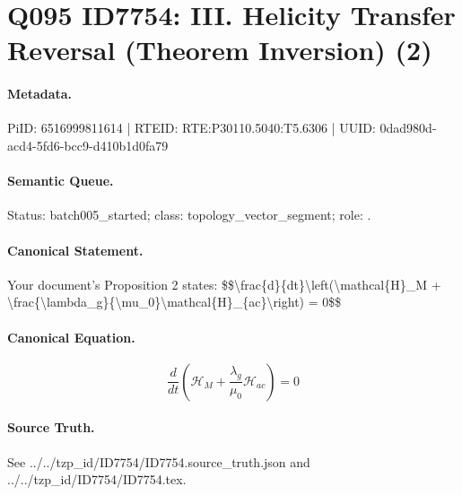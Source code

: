 \section*{Q095 ID7754: III. Helicity Transfer Reversal (Theorem Inversion) (2)}
\paragraph{Metadata.}
PiID: 6516999811614 | RTEID: RTE:P30110.5040:T5.6306 | UUID: 0dad980d-acd4-5fd6-bcc9-d410b1d0fa79

\paragraph{Semantic Queue.}
Status: batch005\_started; class: topology\_vector\_segment; role: .

\paragraph{Canonical Statement.}
Your document's Proposition 2 states: \$\$\textbackslash{}frac\{d\}\{dt\}\textbackslash{}left(\textbackslash{}mathcal\{H\}\_M + \textbackslash{}frac\{\textbackslash{}lambda\_g\}\{\textbackslash{}mu\_0\}\textbackslash{}mathcal\{H\}\_\{ac\}\textbackslash{}right) = 0\$\$

\paragraph{Canonical Equation.}
\[
\frac{d}{dt}\left(\mathcal{H}_M + \frac{\lambda_g}{\mu_0}\mathcal{H}_{ac}\right) = 0
\]

\paragraph{Source Truth.}
See ../../tzp\_id/ID7754/ID7754.source\_truth.json and ../../tzp\_id/ID7754/ID7754.tex.
